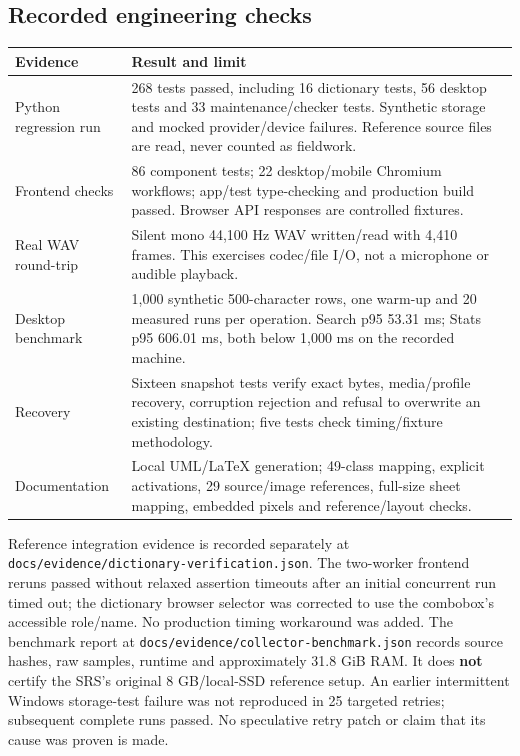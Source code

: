 \documentclass[11pt,a4paper]{article}
\begin{document}
\subsection{Recorded engineering checks}
\begin{longtable}{L{3.8cm}L{10.8cm}}
\toprule\textbf{Evidence} & \textbf{Result and limit}\\\midrule\endhead
Python regression run & 268 tests passed, including 16 dictionary tests, 56 desktop tests and 33 maintenance/checker tests. Synthetic storage and mocked provider/device failures. Reference source files are read, never counted as fieldwork.\\
Frontend checks & 86 component tests; 22 desktop/mobile Chromium workflows; app/test type-checking and production build passed. Browser API responses are controlled fixtures.\\
Real WAV round-trip & Silent mono 44,100 Hz WAV written/read with 4,410 frames. This exercises codec/file I/O, not a microphone or audible playback.\\
Desktop benchmark & 1,000 synthetic 500-character rows, one warm-up and 20 measured runs per operation. Search p95 53.31 ms; Stats p95 606.01 ms, both below 1,000 ms on the recorded machine.\\
Recovery & Sixteen snapshot tests verify exact bytes, media/profile recovery, corruption rejection and refusal to overwrite an existing destination; five tests check timing/fixture methodology.\\
Documentation & Local UML/LaTeX generation; 49-class mapping, explicit activations, 29 source/image references, full-size sheet mapping, embedded pixels and reference/layout checks.\\
\bottomrule\end{longtable}
Reference integration evidence is recorded separately at
\nolinkurl{docs/evidence/dictionary-verification.json}. The two-worker frontend
reruns passed without relaxed assertion timeouts after an initial concurrent
run timed out; the dictionary browser selector was corrected to use the
combobox's accessible role/name. No production timing workaround was added.
The benchmark report at \nolinkurl{docs/evidence/collector-benchmark.json}
records source hashes, raw samples, runtime and approximately 31.8 GiB RAM.
It does \textbf{not} certify the SRS's original 8 GB/local-SSD reference setup.
An earlier intermittent Windows storage-test failure was not reproduced in
25 targeted retries; subsequent complete runs passed. No speculative retry
patch or claim that its cause was proven is made.
\end{document}
